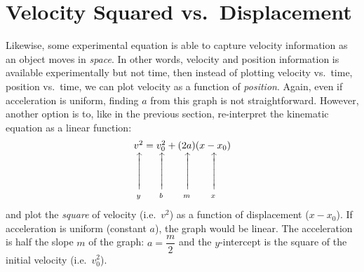\documentclass{../../../oss-handout}
\makeatletter
\newcommand\vertarrowbox[2]{%
    \begin{array}[t]{@{}c@{}} #1 \\
    \rotatebox{90}{$\xrightarrow{\hphantom{abcdefgh}}$} \\[-1ex]
    \mathclap{\scriptstyle\text{#2}}%
    \end{array}}
\makeatother
\begin{document}
\section{Velocity Squared vs.\ Displacement}
Likewise, some experimental equation is able to capture velocity information
as an object moves in \emph{space}. In other words, velocity and position
information is available experimentally but not time, then instead of plotting
velocity vs.\ time, position vs.\ time, we can plot velocity as a function of
\emph{position}. Again, even if acceleration is uniform, finding $a$ from this
graph is not straightforward. However, another option is to, like in the
previous section, re-interpret the kinematic equation as a linear function:
\begin{equation}
  \vertarrowbox{v^2}{$y$}=
  \vertarrowbox{v_0^2}{$b$}+\vertarrowbox{(2a)}{$m$}
  \vertarrowbox{(x-x_0)}{$x$}
\end{equation}
and plot the \emph{square} of velocity (i.e.\ $v^2$) as a function of
displacement ($x-x_0$). If acceleration is uniform (constant $a$), the graph
would be linear. The acceleration is half the slope $m$ of the graph:
$a=\dfrac m2$ and the $y$-intercept is the square of the initial velocity
(i.e.\ $v_0^2$).
\end{document}
